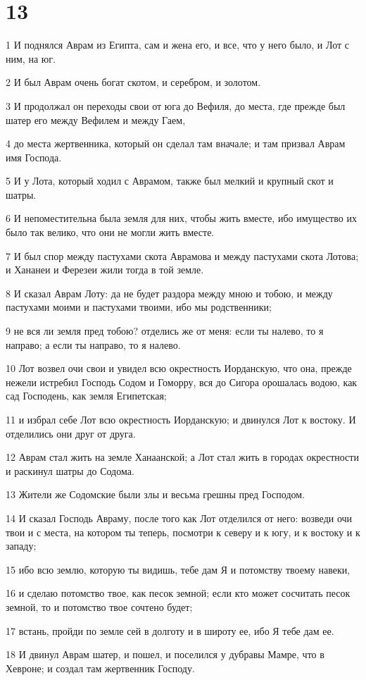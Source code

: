 \chapter{13}

\par 1 И поднялся Аврам из Египта, сам и жена его, и все, что у него было, и Лот с ним, на юг.
\par 2 И был Аврам очень богат скотом, и серебром, и золотом.
\par 3 И продолжал он переходы свои от юга до Вефиля, до места, где прежде был шатер его между Вефилем и между Гаем,
\par 4 до места жертвенника, который он сделал там вначале; и там призвал Аврам имя Господа.
\par 5 И у Лота, который ходил с Аврамом, также был мелкий и крупный скот и шатры.
\par 6 И непоместительна была земля для них, чтобы жить вместе, ибо имущество их было так велико, что они не могли жить вместе.
\par 7 И был спор между пастухами скота Аврамова и между пастухами скота Лотова; и Хананеи и Ферезеи жили тогда в той земле.
\par 8 И сказал Аврам Лоту: да не будет раздора между мною и тобою, и между пастухами моими и пастухами твоими, ибо мы родственники;
\par 9 не вся ли земля пред тобою? отделись же от меня: если ты налево, то я направо; а если ты направо, то я налево.
\par 10 Лот возвел очи свои и увидел всю окрестность Иорданскую, что она, прежде нежели истребил Господь Содом и Гоморру, вся до Сигора орошалась водою, как сад Господень, как земля Египетская;
\par 11 и избрал себе Лот всю окрестность Иорданскую; и двинулся Лот к востоку. И отделились они друг от друга.
\par 12 Аврам стал жить на земле Ханаанской; а Лот стал жить в городах окрестности и раскинул шатры до Содома.
\par 13 Жители же Содомские были злы и весьма грешны пред Господом.
\par 14 И сказал Господь Авраму, после того как Лот отделился от него: возведи очи твои и с места, на котором ты теперь, посмотри к северу и к югу, и к востоку и к западу;
\par 15 ибо всю землю, которую ты видишь, тебе дам Я и потомству твоему навеки,
\par 16 и сделаю потомство твое, как песок земной; если кто может сосчитать песок земной, то и потомство твое сочтено будет;
\par 17 встань, пройди по земле сей в долготу и в широту ее, ибо Я тебе дам ее.
\par 18 И двинул Аврам шатер, и пошел, и поселился у дубравы Мамре, что в Хевроне; и создал там жертвенник Господу.


